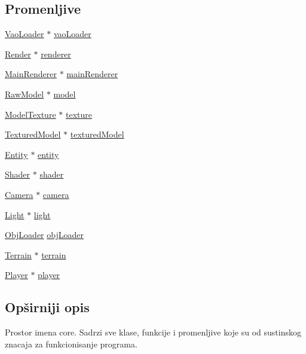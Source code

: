 \subsection*{Promenljive}
\begin{DoxyCompactItemize}
\item 
\hyperlink{classcore_1_1VaoLoader}{Vao\+Loader} $\ast$ \hyperlink{namespacecore_a78dd24784c415d3759a0f71b8f4f9f81}{vao\+Loader}
\item 
\hyperlink{classcore_1_1Render}{Render} $\ast$ \hyperlink{namespacecore_a4f2740ccbefd3bb34c624a8c99d6446d}{renderer}
\item 
\hyperlink{classcore_1_1MainRenderer}{Main\+Renderer} $\ast$ \hyperlink{namespacecore_a01adfda2bbace85dc243e5fba0d93b52}{main\+Renderer}
\item 
\hyperlink{classmodel_1_1RawModel}{Raw\+Model} $\ast$ \hyperlink{namespacecore_aa1479d4ed4dadbfe085b26662122b68a}{model}
\item 
\hyperlink{classtexture_1_1ModelTexture}{Model\+Texture} $\ast$ \hyperlink{namespacecore_a0738503bf610d37d44b4938dc024bfcc}{texture}
\item 
\hyperlink{classmodel_1_1TexturedModel}{Textured\+Model} $\ast$ \hyperlink{namespacecore_ad4d5c25548862489d6a237342748ad74}{textured\+Model}
\item 
\hyperlink{classentity_1_1Entity}{Entity} $\ast$ \hyperlink{namespacecore_aa710c0ea388433d2d80d1d1c67582eda}{entity}
\item 
\hyperlink{classshader_1_1Shader}{Shader} $\ast$ \hyperlink{namespacecore_adf2f7f5f951bd01b06d6c792d7bf301b}{shader}
\item 
\hyperlink{classentity_1_1Camera}{Camera} $\ast$ \hyperlink{namespacecore_a9d645c490b142886301256f6cf9c65c2}{camera}
\item 
\hyperlink{classentity_1_1Light}{Light} $\ast$ \hyperlink{namespacecore_a2324d96000e7c6d42570a0577e8f070b}{light}
\item 
\hyperlink{classcore_1_1ObjLoader}{Obj\+Loader} \hyperlink{namespacecore_abf1a2ebbee224aa2f7a35148ebcac1fb}{obj\+Loader}
\item 
\hyperlink{classterrain_1_1Terrain}{Terrain} $\ast$ \hyperlink{namespacecore_ac45da6f80dac9bead5c9310c27897f15}{terrain}
\item 
\hyperlink{classentity_1_1Player}{Player} $\ast$ \hyperlink{namespacecore_a8130d7cf3bb04bc517651bc3855f8c0f}{player}
\end{DoxyCompactItemize}


\subsection{Opširniji opis}
Prostor imena core. Sadrzi sve klase, funkcije i promenljive koje su od sustinskog znacaja za funkcionisanje programa. 

